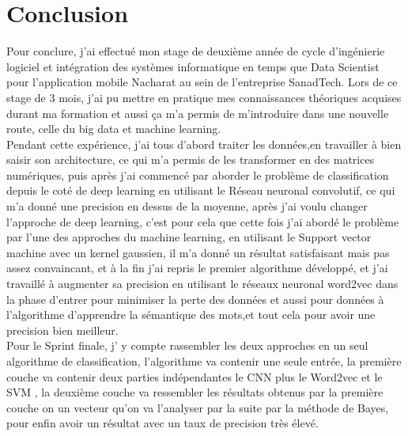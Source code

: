 \chapter*{Conclusion} %
Pour conclure, j’ai effectué mon stage de deuxième année de cycle d'ingénierie logiciel et intégration des systèmes informatique  en temps que Data Scientist pour l'application mobile Nacharat au sein de l’entreprise SanadTech. Lors de ce stage de 3 mois, j’ai pu mettre en pratique mes connaissances théoriques acquises durant ma formation et aussi ça m'a permis de m'introduire dans une nouvelle route, celle du big data et machine learning.\\[0.5cm]
Pendant cette expérience, j'ai tous d'abord traiter les données,en travailler à bien  saisir son architecture, ce qui m'a permis de les transformer en des matrices numériques, puis après j'ai commencé par aborder le problème de classification depuis le coté de deep learning en utilisant le Réseau neuronal convolutif, ce qui m'a donné une precision en dessus de la moyenne, après j'ai voulu changer l'approche de deep learning, c'est pour cela que cette fois j'ai abordé le problème  par l'une des approches du machine learning, en utilisant le Support vector machine avec un kernel gaussien, il m'a donné un résultat satisfaisant mais pas assez convaincant, et à la fin j'ai repris le premier algorithme développé, et j'ai travaillé à augmenter sa precision en utilisant le réseaux neuronal word2vec dans la phase d'entrer pour minimiser la perte des données et aussi pour données à l'algorithme d'apprendre la sémantique des mots,et tout cela pour avoir une precision bien meilleur.\\[0.5cm]
Pour le Sprint finale, j' y compte rassembler les deux approches en un seul algorithme de classification, l'algorithme va contenir une seule entrée, la première couche va contenir deux parties indépendantes le CNN plus le Word2vec et le SVM , la deuxième couche va ressembler les résultats obtenus par la première couche on un vecteur qu'on va l'analyser par la suite par la méthode de Bayes, pour enfin avoir un résultat avec un taux de precision très élevé.